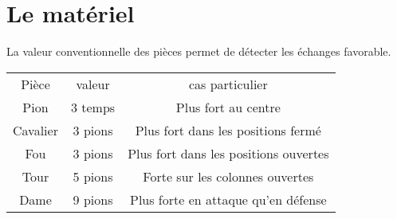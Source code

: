 
\chapter{Le matériel}


La valeur conventionnelle des pièces permet de détecter les échanges favorable.

\begin{center}
\begin{tabular}{ccc}
Pièce & valeur & cas particulier \\
Pion & 3 temps & Plus fort au centre \\
Cavalier & 3 pions & Plus fort dans les positions fermé \\
Fou & 3 pions & Plus fort dans les positions ouvertes\\
Tour & 5 pions & Forte sur les colonnes ouvertes \\
Dame & 9 pions & Plus forte en attaque qu'en défense\\
\end{tabular}
\end{center}



